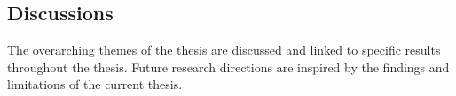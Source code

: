 \subsection*{Discussions}
The overarching themes of the thesis are discussed and linked to specific results throughout the thesis. Future research directions are inspired by the findings and limitations of the current thesis.

